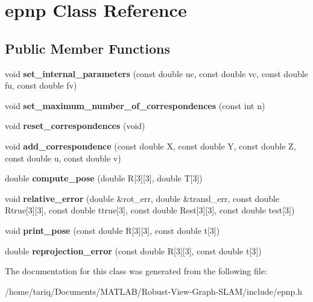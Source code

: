\hypertarget{classepnp}{}\section{epnp Class Reference}
\label{classepnp}
\subsection*{Public Member Functions}
\begin{DoxyCompactItemize}
\item 
void {\bfseries set\+\_\+internal\+\_\+parameters} (const double uc, const double vc, const double fu, const double fv)\hypertarget{classepnp_afeb31b7d569b716480064539781e8f2f}{}\label{classepnp_afeb31b7d569b716480064539781e8f2f}

\item 
void {\bfseries set\+\_\+maximum\+\_\+number\+\_\+of\+\_\+correspondences} (const int n)\hypertarget{classepnp_ad651410250e8390192bd91c8249f02ef}{}\label{classepnp_ad651410250e8390192bd91c8249f02ef}

\item 
void {\bfseries reset\+\_\+correspondences} (void)\hypertarget{classepnp_a383c505d72d4040ed48ae56e161fcb4b}{}\label{classepnp_a383c505d72d4040ed48ae56e161fcb4b}

\item 
void {\bfseries add\+\_\+correspondence} (const double X, const double Y, const double Z, const double u, const double v)\hypertarget{classepnp_a80f1bc80937fc90b852d63e835e1cf9b}{}\label{classepnp_a80f1bc80937fc90b852d63e835e1cf9b}

\item 
double {\bfseries compute\+\_\+pose} (double R\mbox{[}3\mbox{]}\mbox{[}3\mbox{]}, double T\mbox{[}3\mbox{]})\hypertarget{classepnp_ad470f3551074a182a0d9871f7dfcda18}{}\label{classepnp_ad470f3551074a182a0d9871f7dfcda18}

\item 
void {\bfseries relative\+\_\+error} (double \&rot\+\_\+err, double \&transl\+\_\+err, const double Rtrue\mbox{[}3\mbox{]}\mbox{[}3\mbox{]}, const double ttrue\mbox{[}3\mbox{]}, const double Rest\mbox{[}3\mbox{]}\mbox{[}3\mbox{]}, const double test\mbox{[}3\mbox{]})\hypertarget{classepnp_a9f35a32611f8dbf5fcd3293335f111fe}{}\label{classepnp_a9f35a32611f8dbf5fcd3293335f111fe}

\item 
void {\bfseries print\+\_\+pose} (const double R\mbox{[}3\mbox{]}\mbox{[}3\mbox{]}, const double t\mbox{[}3\mbox{]})\hypertarget{classepnp_a549a6df51deaa28bbc6992463471c2b3}{}\label{classepnp_a549a6df51deaa28bbc6992463471c2b3}

\item 
double {\bfseries reprojection\+\_\+error} (const double R\mbox{[}3\mbox{]}\mbox{[}3\mbox{]}, const double t\mbox{[}3\mbox{]})\hypertarget{classepnp_ae6d97f545029c25237475c5216f0510f}{}\label{classepnp_ae6d97f545029c25237475c5216f0510f}

\end{DoxyCompactItemize}


The documentation for this class was generated from the following file\+:\begin{DoxyCompactItemize}
\item 
/home/tariq/\+Documents/\+M\+A\+T\+L\+A\+B/\+Robust-\/\+View-\/\+Graph-\/\+S\+L\+A\+M/include/epnp.\+h\end{DoxyCompactItemize}
